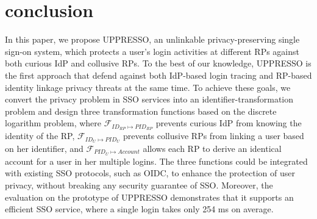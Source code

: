 \section{conclusion}
\label{sec:conclusion}
In this paper, we propose UPPRESSO, an unlinkable privacy-preserving single sign-on system, which protects a user's login activities at different RPs against both curious IdP and collusive RPs. To the best of our knowledge, UPPRESSO is the first approach that defend against both IdP-based login tracing and RP-based identity linkage privacy threats at the same time. To achieve these goals, we convert the privacy problem in SSO services into an identifier-transformation problem and design three transformation functions based on the discrete logarithm problem, where $\mathcal{F}_{ID_{RP} \mapsto PID_{RP}}$ prevents curious IdP from knowing the identity of the RP, $\mathcal{F}_{ID_{U} \mapsto PID_{U}}$ prevents collusive RPs from linking a user based on her identifier, and $\mathcal{F}_{PID_{U} \mapsto Account}$ allows each RP to derive an identical account for a user in her multiple logins. The three functions could be integrated with existing SSO protocols, such as OIDC, to enhance the protection of user privacy, without breaking any security guarantee of SSO. Moreover, the evaluation on the prototype of UPPRESSO demonstrates that it supports an efficient SSO service, where a single login takes only 254 ms on average.
